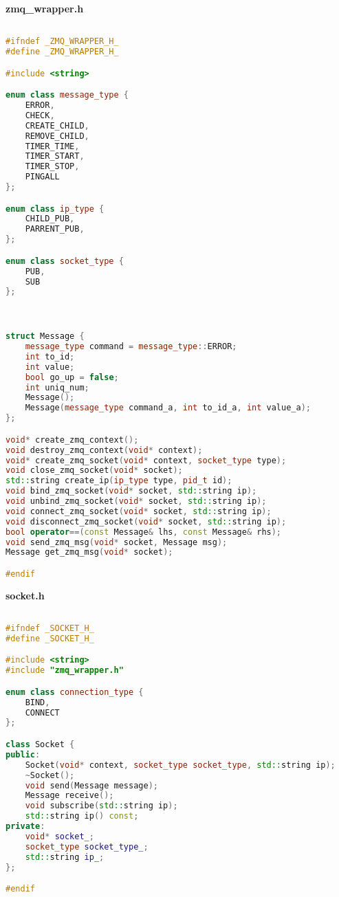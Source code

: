 \textbf{zmq\_wrapper.h}

\begin{lstlisting}[language=C++]

#ifndef _ZMQ_WRAPPER_H_
#define _ZMQ_WRAPPER_H_

#include <string>

enum class message_type {
    ERROR,
    CHECK,
    CREATE_CHILD,
    REMOVE_CHILD,
    TIMER_TIME,
    TIMER_START,
    TIMER_STOP,
    PINGALL
};

enum class ip_type {
    CHILD_PUB,
    PARRENT_PUB,
};

enum class socket_type {
    PUB,
    SUB
};



struct Message {
    message_type command = message_type::ERROR;
    int to_id;
    int value;
    bool go_up = false;
    int uniq_num;
    Message();
    Message(message_type command_a, int to_id_a, int value_a);
};

void* create_zmq_context();
void destroy_zmq_context(void* context);
void* create_zmq_socket(void* context, socket_type type);
void close_zmq_socket(void* socket);
std::string create_ip(ip_type type, pid_t id);
void bind_zmq_socket(void* socket, std::string ip);
void unbind_zmq_socket(void* socket, std::string ip);
void connect_zmq_socket(void* socket, std::string ip);
void disconnect_zmq_socket(void* socket, std::string ip);
bool operator==(const Message& lhs, const Message& rhs);
void send_zmq_msg(void* socket, Message msg);
Message get_zmq_msg(void* socket);

#endif

\end{lstlisting}

\textbf{socket.h}

\begin{lstlisting}[language=C++]

#ifndef _SOCKET_H_
#define _SOCKET_H_

#include <string>
#include "zmq_wrapper.h"

enum class connection_type {
    BIND,
    CONNECT
};

class Socket {
public:
    Socket(void* context, socket_type socket_type, std::string ip);
    ~Socket();
    void send(Message message);
    Message receive();
    void subscribe(std::string ip);
    std::string ip() const;
private:
    void* socket_;
    socket_type socket_type_;
    std::string ip_;
};

#endif

\end{lstlisting}

